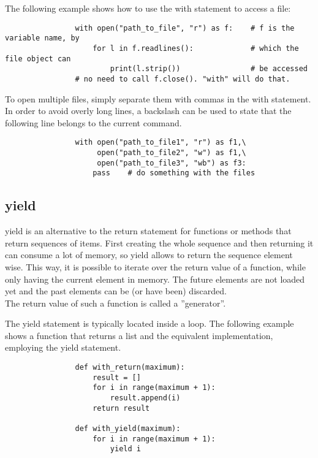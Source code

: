 			The following example shows how to use the {\normalfont \ttfamily with} statement to access a file:
			\begin{verbatim}
				with open("path_to_file", "r") as f:    # f is the variable name, by
					for l in f.readlines():             # which the file object can
						print(l.strip())                # be accessed
				# no need to call f.close(). "with" will do that.
			\end{verbatim}

			To open multiple files, simply separate them with commas in the with statement.
			In order to avoid overly long lines, a backslash can be used to state that the following line belongs to the current command.
			\begin{verbatim}
				with open("path_to_file1", "r") as f1,\
				     open("path_to_file2", "w") as f1,\
				     open("path_to_file3", "wb") as f3:
					pass	# do something with the files
			\end{verbatim}

		\subsection{yield}
			{\normalfont \ttfamily yield} is an alternative to the {\normalfont \ttfamily return} statement for functions or methods that return sequences of items.
			First creating the whole sequence and then returning it can consume a lot of memory, so {\normalfont \ttfamily yield} allows to return the sequence element wise.
			This way, it is possible to iterate over the return value of a function, while only having the current element in memory.
			The future elements are not loaded yet and the past elements can be (or have been) discarded.\\
			The return value of such a function is called a ''generator''.

			The {\normalfont \ttfamily yield} statement is typically located inside a loop.
			The following example shows a function that returns a list and the equivalent implementation, employing the {\normalfont \ttfamily yield} statement.
			\begin{verbatim}
				def with_return(maximum):
					result = []
					for i in range(maximum + 1):
						result.append(i)
					return result

				def with_yield(maximum):
					for i in range(maximum + 1):
						yield i
			\end{verbatim}


